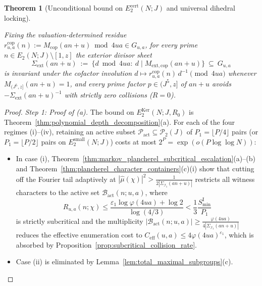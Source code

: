 \documentclass[11pt, a4paper]{article}
\theoremstyle{plain}
\newtheorem{theorem}{Theorem}[section]
\theoremstyle{definition}
\begin{document}
\begin{theorem}[Unconditional bound on $E_2^{\mathrm{cert}}(N;J)$ and universal dihedral locking]
\begin{enumerate}[label=(\alph*)]
    Fixing the valuation-determined residue $r_{u,a}^{\mathrm{cop}}(n):=M_{\mathrm{cop}}(an+u)\bmod 4ua\in G_{u,a}$, for every prime $n\in E_2(N;J)\setminus[1,z]$ the exterior divisor sheet
    \[
    \Sigma_{\mathrm{ext}}(an+u)\ :=\ \Big\{d\bmod 4ua:\ d\mid M_{\mathrm{ext,cop}}(an+u)\Big\}\ \subseteq\ G_{u,a}
    \]
    is invariant under the cofactor involution $d\mapsto r_{u,a}^{\mathrm{cop}}(n)\,d^{-1}\pmod{4ua}$ whenever $M_{(J^{5},z]}(an+u)=1$, and every prime factor $p\in(J^{5},z]$ of $an+u$ avoids $-\Sigma_{\mathrm{ext}}(an+u)^{-1}$ with \emph{strictly zero collisions ($R=0$)}.
\end{enumerate}
\end{theorem}

\begin{proof}
\emph{Step 1: Proof of (a).}
The bound on $E_2^{\mathrm{Ker}}(N;J,R_0)$ is Theorem~\ref{thm:polynomial_depth_decomposition}(a). For each of the four regimes (i)--(iv), retaining an active subset $\mathcal{P}_{\mathrm{act}}\subseteq\mathcal{P}_2(J)$ of $P_1=\lfloor P/4\rfloor$ pairs (or $P_1=\lfloor P/2\rfloor$ pairs on $E_2^{\mathrm{small}}(N;J)$) costs at most $2^{P}=\exp(o(P\log\log N))$:
\begin{itemize}
    \item In case (i), Theorem~\ref{thm:markov_plancherel_subcritical_escalation}(a)--(b) and Theorem~\ref{thm:plancherel_character_containers}(c)(i) show that cutting off the Fourier tail adaptively at $|\widehat{\mu}(\chi)|^{2}>\allowbreak\frac{1}{2|\Sigma_{\mathcal{I}_1}(an+u)|}$ restricts all witness characters to the active set $\mathcal{B}_{\mathrm{act}}(n;u,a)$, where 
    \[
    R_{u,a}(n;\chi)\le\frac{\varepsilon_1\log\varphi(4ua)+\log 2}{\log(4/3)}<\frac13\frac{S_{\min}^{\mathrm{I}}}{P_1}
    \]
    is strictly subcritical and the multiplicity $|\mathcal{B}_{\mathrm{act}}(n;u,a)|\ge\allowbreak\frac{\varphi(4ua)}{4|\Sigma_{\mathcal{I}_1}(an+u)|}$ reduces the effective enumeration cost to $C_{\mathrm{eff}}(u,a)\le\allowbreak 4\varphi(4ua)^{\varepsilon_1}$, which is absorbed by Proposition~\ref{prop:subcritical_collision_rate}.
    
    \item Case (ii) is eliminated by Lemma~\ref{lem:total_maximal_subgroups}(c).
    

\end{itemize}
\end{proof}
\end{document}
